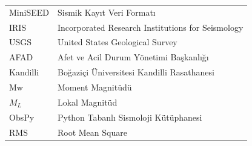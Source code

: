 \begin{longtable}{@{}p{2.5cm}p{10.5cm}@{}}
MiniSEED & Sismik Kayıt Veri Formatı \\
IRIS & Incorporated Research Institutions for Seismology \\
USGS & United States Geological Survey \\
AFAD & Afet ve Acil Durum Yönetimi Başkanlığı \\
Kandilli & Boğaziçi Üniversitesi Kandilli Rasathanesi \\
Mw & Moment Magnitüdü \\
$M_L$ & Lokal Magnitüd \\
ObsPy & Python Tabanlı Sismoloji Kütüphanesi \\
RMS & Root Mean Square \\
\end{longtable}

\renewcommand{\arraystretch}{1.0}
